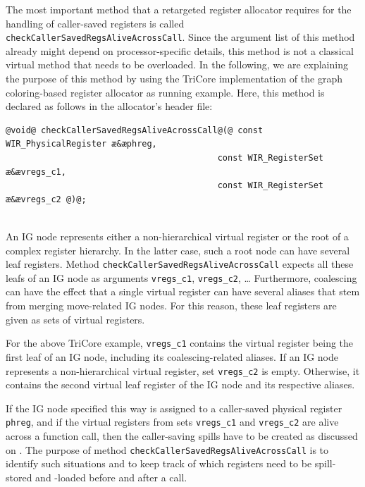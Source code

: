 The most important method that a retargeted register allocator requires for the handling of caller-saved registers is called \texttt{checkCallerSavedRegsAliveAcrossCall}.
Since the argument list of this method already might depend on processor-specific details, this method is not a classical virtual method that needs to be overloaded.
In the following, we are explaining the purpose of this method by using the TriCore implementation of the graph coloring-based register allocator as running example.
Here, this method is declared as follows in the allocator's header file: \\
\begin{lstlisting}[style=code,float=!ht,aboveskip=-0.8 \baselineskip,belowskip=-0.8 \baselineskip]
@void@ checkCallerSavedRegsAliveAcrossCall@(@ const WIR_PhysicalRegister æ&æphreg,
                                          const WIR_RegisterSet æ&ævregs_c1,
                                          const WIR_RegisterSet æ&ævregs_c2 @)@;
\end{lstlisting}
\\
An \gls{IG} node represents either a non-hierarchical virtual register or the root of a complex register hierarchy.
In the latter case, such a root node can have several leaf registers.
Method \texttt{checkCallerSavedRegsAliveAcross\-Call} expects all these leafs of an \gls{IG} node as arguments \texttt{vregs\_c1}, \texttt{vregs\_c2}, \dots
Furthermore, coalescing can have the effect that a single virtual register can have several aliases that stem from merging move-related \gls{IG} nodes.
For this reason, these leaf registers are given as sets of virtual registers.

For the above TriCore example, \texttt{vregs\_c1} contains the virtual register being the first leaf of an \gls{IG} node, including its coalescing-related aliases.
If an \gls{IG} node represents a non-hierarchical virtual register, set \texttt{vregs\_c2} is empty.
Otherwise, it contains the second virtual leaf register of the \gls{IG} node and its respective aliases.

If the \gls{IG} node specified this way is assigned to a caller-saved physical register \texttt{phreg}, and if the virtual registers from sets \texttt{vregs\_c1} and \texttt{vregs\_c2} are alive across a function call, then the caller-saving spills have to be created as discussed on .
The purpose of method \texttt{checkCallerSavedRegsAliveAcrossCall} is to identify such situations and to keep track of which registers need to be spill-stored and -loaded before and after a call.

